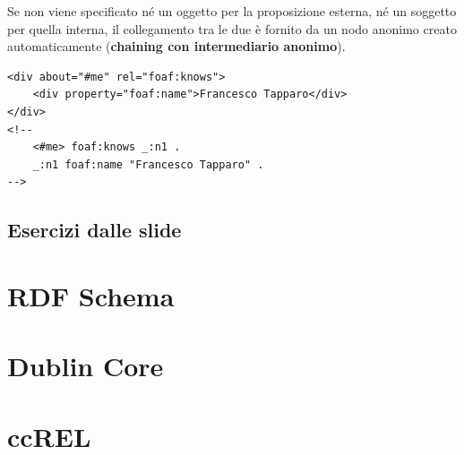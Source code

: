 Se non viene specificato né un oggetto per la proposizione esterna, né un soggetto per quella interna, il collegamento tra le due è fornito da un nodo anonimo creato automaticamente (\textbf{chaining con intermediario anonimo}).

\begin{lstlisting}[language=RDFA, caption=Utilizzo del chaining anonimo]
<div about="#me" rel="foaf:knows">
	<div property="foaf:name">Francesco Tapparo</div>
</div>
<!--
	<#me> foaf:knows _:n1 .
	_:n1 foaf:name "Francesco Tapparo" .
-->
\end{lstlisting}

\subsection{Esercizi dalle slide}

\section{RDF Schema}

\section{Dublin Core}

\section{ccREL}